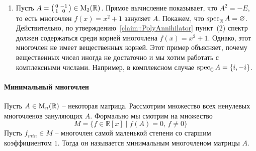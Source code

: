 \begin{enumerate}
Давайте покажем, что $\spec_\mathbb R A = \{\lambda_1,\ldots, \lambda_n\}$.
Так как многочлен $f$ зануляет $A$, утверждение~\ref{claim::PolyAnnihilator} пункт~(2) влечет, что спектр содержится среди его корней.
Значит, надо показать, что $A-\lambda_i E$ необратим для любого $i$.
Последнее легко видеть, так как $A-\lambda_i$ содержит $0$ на $i$-ом месте на диагонали.

\item Пусть $A=\left(\begin{smallmatrix}{0}&{-1}\\{1}&{0}\end{smallmatrix}\right)\in\operatorname{M}_{2}(\mathbb R)$.
Прямое вычисление показывает, что $A^2 = -E$, то есть многочлен $f(x) = x^2 + 1$ зануляет $A$.
Покажем, что $\operatorname{spec}_\mathbb R A = \varnothing$.
Действительно, по утверждению~\ref{claim::PolyAnnihilator} пункт~(2) спектр должен содержаться среди корней многочлена $f(x) = x^2 + 1$.
Однако, этот многочлен не имеет вещественных корней.
Этот пример объясняет, почему вещественных чисел иногда не достаточно и мы хотим работать с комплексными числами.
Например, в комплексном случае $\operatorname{spec}_\mathbb C A = \{i, - i\}$.
\end{enumerate}

\paragraph{Минимальный многочлен}

Пусть $A\in\operatorname{M}_{n}(\mathbb R)$ -- некоторая матрица.
Рассмотрим множество всех ненулевых многочленов зануляющих $A$.
Формально мы смотрим на множество
\[
M = \{f\in\mathbb R[x]\mid f(A)=0,\,f\neq 0\}
\]
Пусть $f_{min}\in M$ -- многочлен самой маленькой степени со старшим коэффициентом $1$.
Тогда он называется минимальным многочленом матрицы $A$.

